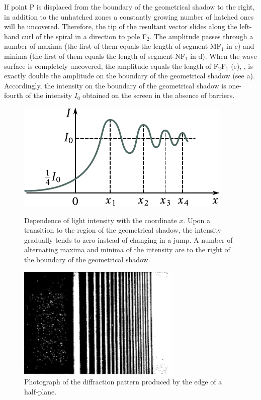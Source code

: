 If point P is displaced from the boundary of the geometrical shadow to the right, in addition to the unhatched zones a constantly growing number of hatched ones will be uncovered.
Therefore, the tip of the resultant vector slides along the left-hand curl of the spiral in a direction to pole F$_2$.
The amplitude passes through a number of maxima (the first of them equals the length of segment MF$_1$ in c) and minima (the first of them equals the length of segment NF$_1$ in d).
When the wave surface is completely uncovered, the amplitude equals the length of F$_2$F$_1$ (e), \ie, is exactly double the amplitude on the boundary of the geometrical shadow (see a).
Accordingly, the intensity on the boundary of the geometrical shadow is one-fourth of the intensity $I_0$ obtained on the screen in the absence of barriers.

\begin{figure}[t]
	\begin{minipage}[t]{0.54\linewidth}
		\begin{center}
			\includegraphics[scale=0.95]{figures/ch_18/fig_18_21.pdf}
            \caption[]{Dependence of light intensity with the coordinate $x$. Upon a transition to the region of the geometrical shadow, the intensity gradually tends to zero instead of changing in a jump. A number of alternating maxima and minima of the intensity are to the right of the boundary of the geometrical shadow.}
			\label{fig:18_21}
		\end{center}
	\end{minipage}
	\hfill{ }%
	\begin{minipage}[t]{0.42\linewidth}
		\begin{center}
			\includegraphics[scale=0.95]{figures/ch_18/fig_18_22.pdf}
			\caption[]{Photograph of the diffraction pattern produced by the edge of a half-plane.}
			\label{fig:18_22}
		\end{center}
	\end{minipage}
\vspace{-0.4cm}
\end{figure}

